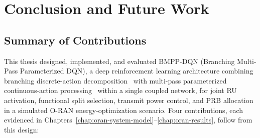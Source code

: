 %
%
%
%

\chapter{Conclusion and Future Work}
\label{chap:oran-conclusion}

\section{Summary of Contributions}
\label{sec:oran-summary-contributions}

This thesis designed, implemented, and evaluated BMPP-DQN (Branching
Multi-Pass Parameterized DQN), a deep reinforcement learning architecture
combining branching discrete-action decomposition~\cite{tavakoli2018branching}
with multi-pass parameterized continuous-action
processing~\cite{xiong2018pdqn,bester2019mpdqn} within a single coupled
network, for joint RU activation, functional split selection, transmit
power control, and PRB allocation in a simulated O-RAN energy-optimization
scenario. Four contributions, each evidenced in
Chapters~\ref{chap:oran-system-model}--\ref{chap:oran-results}, follow from
this design:

